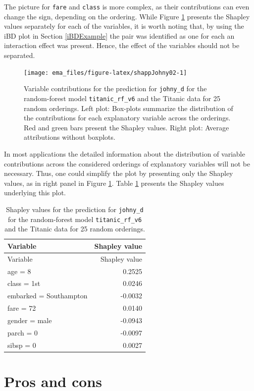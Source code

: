 \documentclass[]{krantz}
\begin{document}
The picture for \texttt{fare} and \texttt{class} is more complex, as their contributions can even change the sign, depending on the ordering. While Figure \ref{fig:shappJohny02} presents the Shapley values separately for each of the variables, it is worth noting that, by using the iBD plot in Section \ref{iBDExample} the pair was identified as one for each an interaction effect was present. Hence, the effect of the variables should not be separated.



\begin{figure}

{\centering \texttt{[image: ema\_files/figure-latex/shappJohny02-1]} 

}

\caption{Variable contributions for the prediction for \texttt{johny\_d} for the random-forest model \texttt{titanic\_rf\_v6} and the Titanic data for 25 random orderings. Left plot: Box-plots summarize the distribution of the contributions for each explanatory variable across the orderings. Red and green bars present the Shapley values. Right plot: Average attributions without boxplots.}\label{fig:shappJohny02}
\end{figure}

In most applications the detailed information about the distribution of variable contributions across the considered orderings of explanatory variables will not be necessary. Thus, one could simplify the plot by presenting only the Shapley values, as in right panel in Figure \ref{fig:shappJohny02}. Table \ref{tab:shapOrderingTable} presents the Shapley values underlying this plot.

\begin{longtable}[]{@{}lr@{}}
\caption{\label{tab:shapOrderingTable} Shapley values for the prediction for \texttt{johny\_d} for the random-forest model \texttt{titanic\_rf\_v6} and the Titanic data for 25 random orderings.}\tabularnewline
\toprule
Variable & Shapley value\tabularnewline
\midrule
\endfirsthead
\toprule
Variable & Shapley value\tabularnewline
\midrule
\endhead
age = 8 & 0.2525\tabularnewline
class = 1st & 0.0246\tabularnewline
embarked = Southampton & -0.0032\tabularnewline
fare = 72 & 0.0140\tabularnewline
gender = male & -0.0943\tabularnewline
parch = 0 & -0.0097\tabularnewline
sibsp = 0 & 0.0027\tabularnewline
\bottomrule
\end{longtable}

\hypertarget{SHAProsCons}{%
\section{Pros and cons}\label{SHAProsCons}}
\end{document}
